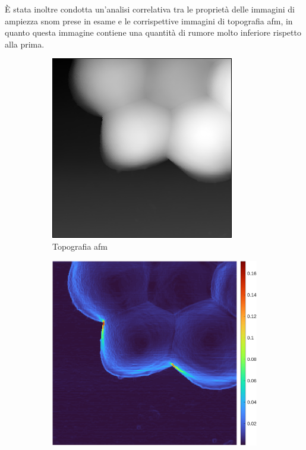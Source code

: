 \documentclass[../main.tex]{subfiles}
\begin{document}
È stata inoltre condotta un'analisi correlativa tra le proprietà delle immagini di ampiezza \acrshort{snom} prese in esame e le corrispettive immagini di topografia \acrshort{afm}, in quanto questa immagine contiene una quantità di rumore molto inferiore rispetto alla prima.

\begin{figure}[ht]
	\centering
	\begin{subfigure}{0.4\linewidth}
		\includegraphics[keepaspectratio, width=\linewidth]{images/sa_zoom_z.png}
		\caption{Topografia \acrshort{afm}}
	\end{subfigure}\hspace{12pt}
	\begin{subfigure}{0.4425\linewidth}
		\includegraphics[keepaspectratio, width=\linewidth]{images/local_std_z.png}

\end{subfigure}
\end{figure}
\end{document}
